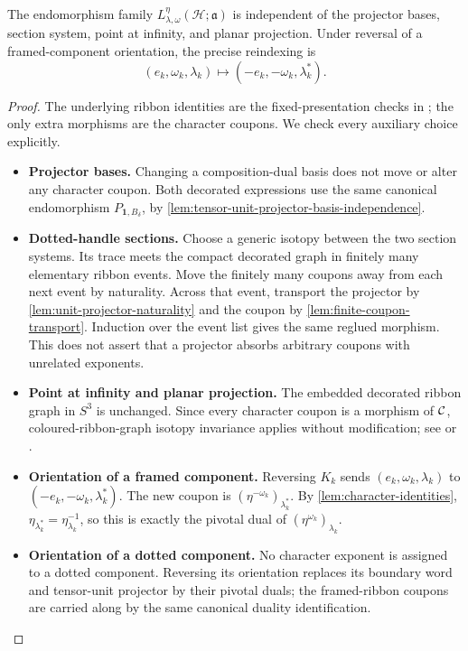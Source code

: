 \begin{proposition}
\label{prop:graphical-auxiliary-independence}
The endomorphism family
\(L^\eta_{\lambda,\omega}(\mathcal H;\mathfrak a)\) is independent of the
projector bases, section system, point at infinity, and planar projection.
Under reversal of a framed-component orientation, the precise reindexing is
\[
  (e_k,\omega_k,\lambda_k)
  \longmapsto(-e_k,-\omega_k,\lambda_k^*).
\]
\end{proposition}

\begin{proof}
The underlying ribbon identities are the fixed-presentation checks in
\cite[Definition~5.11 and Lemma~2.28]{Tham2021}; the only extra morphisms are
the character coupons.  We check every auxiliary choice explicitly.
\begin{itemize}
\item \textbf{Projector bases.}
Changing a composition-dual basis does not move or alter any character
coupon.  Both decorated expressions use the same canonical endomorphism
\(P_{\mathbf1,B_\delta}\), by
\cref{lem:tensor-unit-projector-basis-independence}.

\item \textbf{Dotted-handle sections.}
Choose a generic isotopy between the two section systems.  Its trace meets
the compact decorated graph in finitely many elementary ribbon events.  Move
the finitely many coupons away from each next event by naturality.  Across
that event, transport the projector by
\cref{lem:unit-projector-naturality} and the coupon by
\cref{lem:finite-coupon-transport}.  Induction over the event list gives the
same reglued morphism.  This does not assert that a projector absorbs
arbitrary coupons with unrelated exponents.

\item \textbf{Point at infinity and planar projection.}
The embedded decorated ribbon graph in \(S^3\) is unchanged.  Since every
character coupon is a morphism of \(\mathcal{C}\), coloured-ribbon-graph isotopy
invariance applies without modification; see
\cite[Propositions~3.33--3.34]{Tham2021} or
\cite[Theorem~6.1]{Shum1994}.

\item \textbf{Orientation of a framed component.}
Reversing \(K_k\) sends \((e_k,\omega_k,\lambda_k)\) to
\((-e_k,-\omega_k,\lambda_k^*)\).  The new coupon is
\((\eta^{-\omega_k})_{\lambda_k^*}\).  By
\cref{lem:character-identities},
\(\eta_{\lambda_k^*}=\eta_{\lambda_k}^{-1}\), so this is exactly the
pivotal dual of \((\eta^{\omega_k})_{\lambda_k}\).

\item \textbf{Orientation of a dotted component.}
No character exponent is assigned to a dotted component.  Reversing its
orientation replaces its boundary word and tensor-unit projector by their
pivotal duals; the framed-ribbon coupons are carried along by the same
canonical duality identification.
\end{itemize}
\end{proof}

